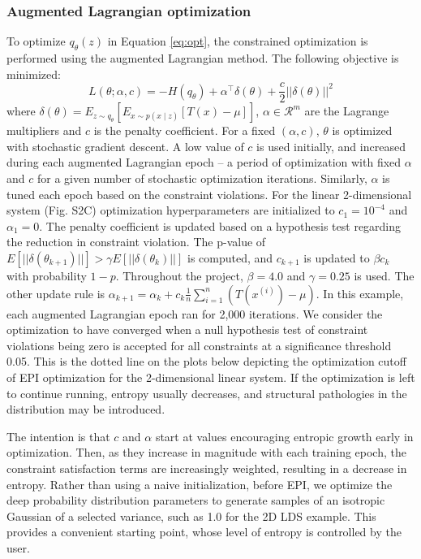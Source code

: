 \documentclass[11pt]{article}
\begin{document}
\subsubsection{Augmented Lagrangian optimization}\label{methods_AL_opt}
To optimize $q_\theta(z)$ in Equation \ref{eq:opt}, the constrained optimization is performed using the augmented Lagrangian method.  The following objective is minimized:
\begin{equation}
L(\theta; \alpha, c) = -H(q_\theta) + \alpha^\top \delta(\theta) + \frac{c}{2}||\delta(\theta)||^2
\end{equation}
where $\delta(\theta) = E_{z \sim q_\theta}\left[ E_{x\sim p(x \mid z)}\left[T(x) - \mu \right] \right]$, $\alpha \in \mathcal{R}^m$ are the Lagrange multipliers and $c$ is the penalty coefficient.  For a fixed $(\alpha, c)$, $\theta$ is optimized with stochastic gradient descent.  A low value of $c$ is used initially, and increased during each augmented Lagrangian epoch -- a period of optimization with fixed $\alpha$ and $c$ for a given number of stochastic optimization iterations. Similarly, $\alpha$ is tuned each epoch based on the constraint violations.  For the linear 2-dimensional system (Fig. S2C) optimization hyperparameters are initialized to $c_1 = 10^{-4}$ and $\alpha_1 = 0$.  The penalty coefficient is updated based on a hypothesis test regarding the reduction in constraint violation.  The p-value of $E[||\delta(\theta_{k+1})||] > \gamma E[||\delta(\theta_{k})||]$ is computed, and $c_{k+1}$ is updated  to $\beta c_k$ with probability $1-p$.  Throughout the project, $\beta = 4.0$ and $\gamma = 0.25$ is used.  The other update rule is $\alpha_{k+1} = \alpha_k + c_k \frac{1}{n} \sum_{i=1}^n (T(x^{(i)}) - \mu)$.  In this example, each augmented Lagrangian epoch ran for 2,000 iterations.  We consider the optimization to have converged when a null hypothesis test of constraint violations being zero is accepted for all constraints at a significance threshold 0.05.  This is the dotted line on the plots below depicting the optimization cutoff of EPI optimization for the 2-dimensional linear system.  If the optimization is left to continue running, entropy usually decreases, and structural pathologies in the distribution may be introduced.

The intention is that $c$ and $\alpha$ start at values encouraging entropic growth early in optimization.  Then, as they increase in magnitude with each training epoch, the constraint satisfaction terms are increasingly weighted, resulting in a decrease in entropy.  Rather than using a naive initialization, before EPI, we optimize the deep probability distribution parameters to generate samples of an isotropic Gaussian of a selected variance, such as 1.0 for the 2D LDS example.  This provides a convenient starting point, whose level of entropy is controlled by the user.
\end{document}

